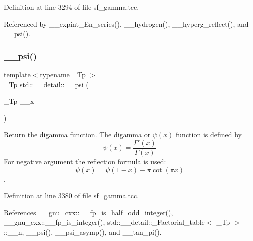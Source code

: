 Definition at line 3294 of file sf\+\_\+gamma.\+tcc.



Referenced by \+\_\+\+\_\+expint\+\_\+\+En\+\_\+series(), \+\_\+\+\_\+hydrogen(), \+\_\+\+\_\+hyperg\+\_\+reflect(), and \+\_\+\+\_\+psi().

\mbox{\label{namespacestd_1_1____detail_ad7246a3ca90be800e6cc79c8e2360abd}} 
\subsubsection{\texorpdfstring{\+\_\+\+\_\+psi()}{\_\_psi()}\hspace{0.1cm}{\footnotesize\ttfamily [2/3]}}
{\footnotesize\ttfamily template$<$typename \+\_\+\+Tp $>$ \\
\+\_\+\+Tp std\+::\+\_\+\+\_\+detail\+::\+\_\+\+\_\+psi (\begin{DoxyParamCaption}\item[{\+\_\+\+Tp}]{\+\_\+\+\_\+x }\end{DoxyParamCaption})}



Return the digamma function. The digamma or $ \psi(x) $ function is defined by \[ \psi(x) = \frac{\Gamma'(x)}{\Gamma(x)} \] For negative argument the reflection formula is used\+: \[ \psi(x) = \psi(1-x) - \pi \cot(\pi x) \]. 



Definition at line 3380 of file sf\+\_\+gamma.\+tcc.



References \+\_\+\+\_\+gnu\+\_\+cxx\+::\+\_\+\+\_\+fp\+\_\+is\+\_\+half\+\_\+odd\+\_\+integer(), \+\_\+\+\_\+gnu\+\_\+cxx\+::\+\_\+\+\_\+fp\+\_\+is\+\_\+integer(), std\+::\+\_\+\+\_\+detail\+::\+\_\+\+Factorial\+\_\+table$<$ \+\_\+\+Tp $>$\+::\+\_\+\+\_\+n, \+\_\+\+\_\+psi(), \+\_\+\+\_\+psi\+\_\+asymp(), and \+\_\+\+\_\+tan\+\_\+pi().

\mbox{\label{namespacestd_1_1____detail_a96d6b8301ca54615364a53665b347f6c}} 
